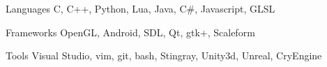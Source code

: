 


\begin{cvskills}


\cvskill
{Languages} %
{C, C++, Python, Lua, Java, C\#, Javascript, GLSL } %

\cvskill
{Frameworks}
{OpenGL, Android, SDL, Qt, gtk+, Scaleform}

\cvskill
{Tools}
{Visual Studio, vim, git, bash, Stingray, Unity3d, Unreal, CryEngine}



\end{cvskills}
